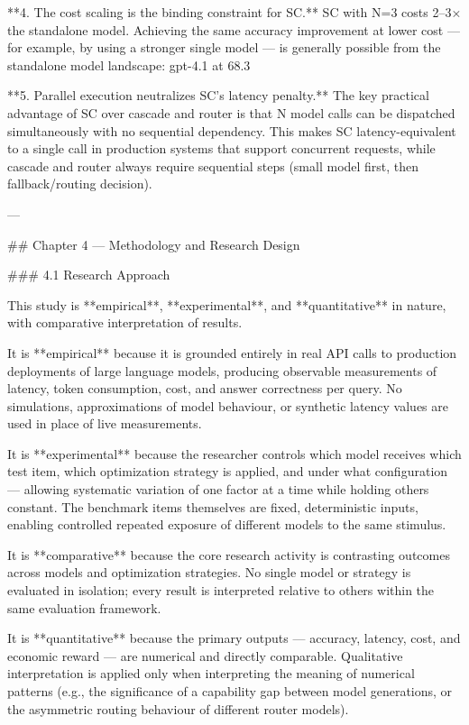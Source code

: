 **4. The cost scaling is the binding constraint for SC.** SC with N=3 costs 2–3× the standalone model. Achieving the same accuracy improvement at lower cost — for example, by using a stronger single model — is generally possible from the standalone model landscape: gpt-4.1 at 68.3%

**5. Parallel execution neutralizes SC's latency penalty.** The key practical advantage of SC over cascade and router is that N model calls can be dispatched simultaneously with no sequential dependency. This makes SC latency-equivalent to a single call in production systems that support concurrent requests, while cascade and router always require sequential steps (small model first, then fallback/routing decision).


---

## Chapter 4 — Methodology and Research Design

### 4.1 Research Approach

This study is **empirical**, **experimental**, and **quantitative** in nature, with comparative interpretation of results.

It is **empirical** because it is grounded entirely in real API calls to production deployments of large language models, producing observable measurements of latency, token consumption, cost, and answer correctness per query. No simulations, approximations of model behaviour, or synthetic latency values are used in place of live measurements.

It is **experimental** because the researcher controls which model receives which test item, which optimization strategy is applied, and under what configuration — allowing systematic variation of one factor at a time while holding others constant. The benchmark items themselves are fixed, deterministic inputs, enabling controlled repeated exposure of different models to the same stimulus.

It is **comparative** because the core research activity is contrasting outcomes across models and optimization strategies. No single model or strategy is evaluated in isolation; every result is interpreted relative to others within the same evaluation framework.

It is **quantitative** because the primary outputs — accuracy, latency, cost, and economic reward — are numerical and directly comparable. Qualitative interpretation is applied only when interpreting the meaning of numerical patterns (e.g., the significance of a capability gap between model generations, or the asymmetric routing behaviour of different router models).

